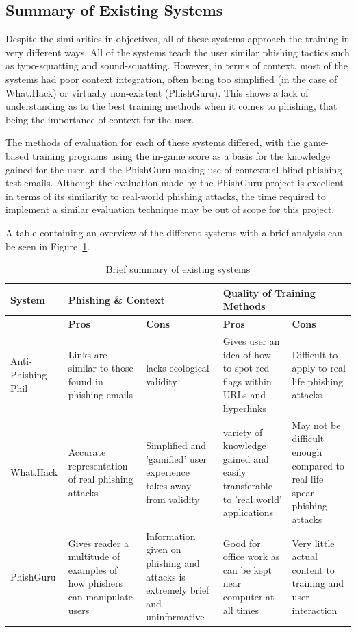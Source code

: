\documentclass{l4proj}
\begin{document}
\subsection{Summary of Existing Systems}
Despite the similarities in objectives, all of these systems approach the training in very different ways. All of the systems teach the user similar phishing tactics such as typo-squatting and sound-squatting. However, in terms of context, most of the systems had poor context integration, often being too simplified (in the case of What.Hack) or virtually non-existent (PhishGuru). This shows a lack of understanding as to the best training methods when it comes to phishing, that being the importance of context for the user. 

The methods of evaluation for each of these systems differed, with the game-based training programs using the in-game score as a basis for the knowledge gained for the user, and the PhishGuru making use of contextual blind phishing test emails. Although the evaluation made by the PhishGuru project is excellent in terms of its similarity to real-world phishing attacks, the time required to implement a similar evaluation technique may be out of scope for this project. 

A table containing an overview of the different systems with a brief analysis can be seen in Figure~\ref{fig:sum_sys}.

\begin{table}[H]
\begin{adjustwidth}{-7em}{-5em}
\begin{tabular}{ | m{8em} | m{10em} | m{10em} | m{10em} | m{10em} | } 
 \hline
 \textbf{System} & \multicolumn{2}{l|}{\textbf{Phishing \& Context}} & \multicolumn{2}{l|}{\textbf{Quality of Training Methods}}  \\
 \hline
   & \textbf{Pros} & \textbf{Cons} & \textbf{Pros} & \textbf{Cons} \\
 \hline
  Anti-Phishing Phil & Links are similar to those found in phishing emails & lacks ecological validity  & Gives user an idea of how to spot red flags within URLs and hyperlinks & Difficult to apply to real life phishing attacks 
  \\
 \hline
 What.Hack & Accurate representation of real phishing attacks & Simplified and 'gamified' user experience takes away from validity & variety of knowledge gained and easily transferable to 'real world' applications & May not be difficult enough compared to real life spear-phishing attacks
  \\
 \hline
 PhishGuru & Gives reader a multitude of examples of how phishers can manipulate users & Information given on phishing and attacks is extremely brief and uninformative & Good for office work as can be kept near computer at all times & Very little actual content to training and user interaction
  \\
 \hline
\end{tabular}
\end{adjustwidth}
\caption{Brief summary of existing systems}
\label{fig:sum_sys}
\end{table}
\end{document}
